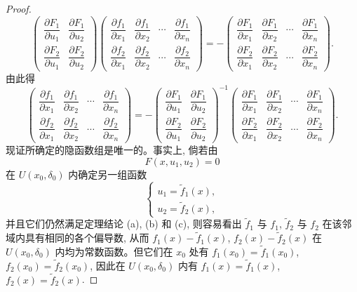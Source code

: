 \begin{proof}
\[
  \begin{pmatrix}
    \dfrac{\partial F_1}{\partial u_1} &
    \dfrac{\partial F_1}{\partial u_2}\\
    \dfrac{\partial F_2}{\partial u_1} &
    \dfrac{\partial F_2}{\partial u_2}
  \end{pmatrix}
  \begin{pmatrix}
    \dfrac{\partial f_1}{\partial x_1} &
    \dfrac{\partial f_1}{\partial x_2} &
    \cdots &
    \dfrac{\partial f_1}{\partial x_n}\\
    \dfrac{\partial f_2}{\partial x_1} &
    \dfrac{\partial f_2}{\partial x_2} &
    \cdots &
    \dfrac{\partial f_2}{\partial x_n}
  \end{pmatrix}
  =-
  \begin{pmatrix}
    \dfrac{\partial F_1}{\partial x_1} &
    \dfrac{\partial F_1}{\partial x_2} &
    \cdots &
    \dfrac{\partial F_1}{\partial x_n}\\
    \dfrac{\partial F_2}{\partial x_1} &
    \dfrac{\partial F_2}{\partial x_2} &
    \cdots &
    \dfrac{\partial F_2}{\partial x_n}
  \end{pmatrix}.
\]
由此得
\[
  \begin{pmatrix}
    \dfrac{\partial f_1}{\partial x_1} &
    \dfrac{\partial f_1}{\partial x_2} &
    \cdots &
    \dfrac{\partial f_1}{\partial x_n}\\
    \dfrac{\partial f_2}{\partial x_1} &
    \dfrac{\partial f_2}{\partial x_2} &
    \cdots &
    \dfrac{\partial f_2}{\partial x_n}
  \end{pmatrix}
  =-
  \begin{pmatrix}
    \dfrac{\partial F_1}{\partial u_1} &
    \dfrac{\partial F_1}{\partial u_2}\\
    \dfrac{\partial F_2}{\partial u_1} &
    \dfrac{\partial F_2}{\partial u_2}
  \end{pmatrix}^{-1}
  \begin{pmatrix}
    \dfrac{\partial F_1}{\partial x_1} &
    \dfrac{\partial F_1}{\partial x_2} &
    \cdots &
    \dfrac{\partial F_1}{\partial x_n}\\
    \dfrac{\partial F_2}{\partial x_1} &
    \dfrac{\partial F_2}{\partial x_2} &
    \cdots &
    \dfrac{\partial F_2}{\partial x_n}
  \end{pmatrix}.
\]
现证所确定的隐函数组是唯一的。事实上, 倘若由
\[
  F(x,u_1,u_2)=0
\]
在 $U(x_0,\delta_0)$ 内确定另一组函数
\[
  \begin{cases}
    u_1=\tilde f_1(x),\\
    u_2=\tilde f_2(x),
  \end{cases}
\]
并且它们仍然满足定理结论 (a), (b) 和 (c), 则容易看出 $\tilde f_1$ 与 $f_1$, $\tilde f_2$ 与 $f_2$ 在该邻域内具有相同的各个偏导数, 从而 $f_1(x)-\tilde f_1(x)$, $f_2(x)-\tilde f_2(x)$ 在 $U(x_0,\delta_0)$ 内均为常数函数。但它们在 $x_0$ 处有 $f_1(x_0)=\tilde f_1(x_0)$, $f_2(x_0)=\tilde f_2(x_0)$, 因此在 $U(x_0,\delta_0)$ 内有 $f_1(x)=\tilde f_1(x)$, $f_2(x)=\tilde f_2(x)$.
\end{proof}


